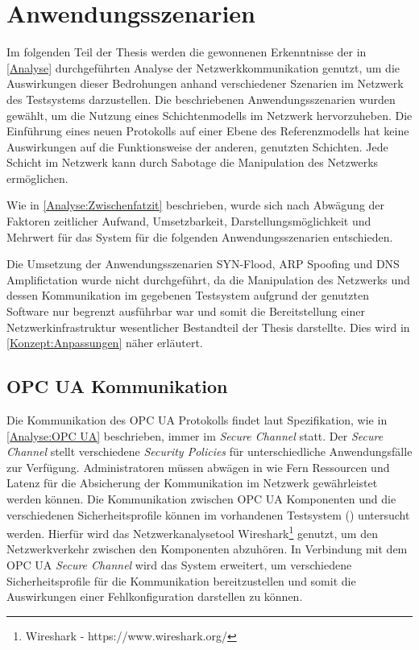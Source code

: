 \chapter{Anwendungsszenarien}
\label{Anwendungsszenarien}
Im folgenden Teil der Thesis werden die gewonnenen Erkenntnisse der in \autoref{Analyse} durchgeführten Analyse der Netzwerkkommunikation genutzt, um die Auswirkungen dieser Bedrohungen anhand verschiedener Szenarien im Netzwerk des Testsystems darzustellen. Die beschriebenen Anwendungsszenarien wurden gewählt, um die Nutzung eines Schichtenmodells im Netzwerk hervorzuheben. Die Einführung eines neuen Protokolls auf einer Ebene des Referenzmodells hat keine Auswirkungen auf die Funktionsweise der anderen, genutzten Schichten. Jede Schicht im Netzwerk kann durch Sabotage die Manipulation des Netzwerks ermöglichen.

Wie in \autoref{Analyse:Zwischenfatzit} beschrieben, wurde sich nach Abwägung der Faktoren zeitlicher Aufwand, Umsetzbarkeit, Darstellungsmöglichkeit und Mehrwert für das System für die folgenden Anwendungsszenarien entschieden.

Die Umsetzung der Anwendungsszenarien SYN-Flood, \ac{ARP} Spoofing und \ac{DNS} Amplifictation wurde nicht durchgeführt, da die Manipulation des Netzwerks und dessen Kommunikation im gegebenen Testsystem aufgrund der genutzten Software nur begrenzt ausführbar war und somit die Bereitstellung einer Netzwerkinfrastruktur wesentlicher Bestandteil der Thesis darstellte. Dies wird in \autoref{Konzept:Anpassungen} näher erläutert.

\section{\ac{OPC UA} Kommunikation}
\label{Anwendungsszenarien:OPC UA Kommunikation}
Die Kommunikation des \ac{OPC UA} Protokolls findet laut Spezifikation, wie in \autoref{Analyse:OPC UA} beschrieben, immer im \textit{Secure Channel} statt. Der \textit{Secure Channel} stellt verschiedene \textit{Security Policies} für unterschiedliche Anwendungsfälle zur Verfügung. Administratoren müssen abwägen in wie Fern Ressourcen und Latenz für die Absicherung der Kommunikation im Netzwerk gewährleistet werden können. Die Kommunikation zwischen \ac{OPC UA} Komponenten und die verschiedenen Sicherheitsprofile können im vorhandenen Testsystem (\cite{Weber2018}) untersucht werden. Hierfür wird das Netzwerkanalysetool Wireshark\footnote{Wireshark - https://www.wireshark.org/} genutzt, um den Netzwerkverkehr zwischen den Komponenten abzuhören. In Verbindung mit dem \ac{OPC UA} \textit{Secure Channel} wird das System erweitert, um verschiedene Sicherheitsprofile für die Kommunikation bereitzustellen und somit die Auswirkungen einer Fehlkonfiguration darstellen zu können.

